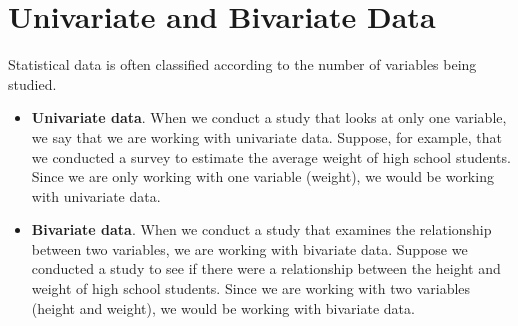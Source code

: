 \section{Univariate and  Bivariate Data}
Statistical data is often classified according to the number of variables being studied.
\begin{itemize}
	\item	\textbf{Univariate data}. When we conduct a study that looks at only one variable, we say that we are working with univariate data. Suppose, for example, that we conducted a survey to estimate the average weight of high school students. Since we are only working with one variable (weight), we would be working with univariate data.
	\item	\textbf{Bivariate data}. When we conduct a study that examines the relationship between two variables, we are working with bivariate data. Suppose we conducted a study to see if there were a relationship between the height and weight of high school students. Since we are working with two variables (height and weight), we would be working with bivariate data. 
\end{itemize}

